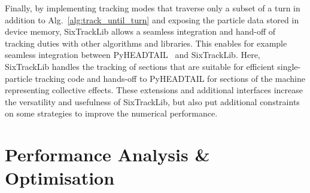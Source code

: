 \documentclass[a4paper,
               refpage,       %
               keeplastbox,   %
               ]{jacow}
\begin{document}
Finally, by implementing tracking modes that traverse only a subset of a turn in addition to Alg.~\ref{alg:track_until_turn} and exposing the particle data stored in device memory, SixTrackLib allows a seamless integration and hand-off of tracking duties with other algorithms and libraries. 
This enables for example seamless integration between  PyHEADTAIL~\cite{pyheadtail-repo-2021} and SixTrackLib. Here, SixTrackLib handles the tracking of sections that are suitable for efficient single-particle tracking code and hands-off to PyHEADTAIL for sections of the machine representing collective effects.
These extensions and additional interfaces increase the versatility and usefulness of SixTrackLib, but also put additional constraints on some strategies to improve the numerical performance.


\section{Performance Analysis \& Optimisation}
\end{document}
